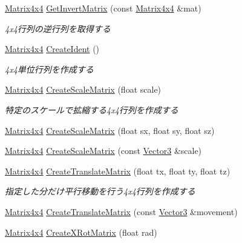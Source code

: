 \begin{DoxyCompactItemize}
\mbox{\hyperlink{struct_math_1_1_matrix4x4}{Matrix4x4}} \mbox{\hyperlink{namespace_math_a1511b5df243ca4ee521026cb9b373efd}{Get\+Invert\+Matrix}} (const \mbox{\hyperlink{struct_math_1_1_matrix4x4}{Matrix4x4}} \&mat)
\begin{DoxyCompactList}\small\item\em 4x4行列の逆行列を取得する \end{DoxyCompactList}\item 
\mbox{\hyperlink{struct_math_1_1_matrix4x4}{Matrix4x4}} \mbox{\hyperlink{namespace_math_aad7bb8945263031607f8b323d9ae1cd7}{Create\+Ident}} ()
\begin{DoxyCompactList}\small\item\em 4x4単位行列を作成する \end{DoxyCompactList}\item 
\mbox{\hyperlink{struct_math_1_1_matrix4x4}{Matrix4x4}} \mbox{\hyperlink{namespace_math_a70c81aec69f6a6b6e586a0d0f5d2ae71}{Create\+Scale\+Matrix}} (float scale)
\begin{DoxyCompactList}\small\item\em 特定のスケールで拡縮する4x4行列を作成する \end{DoxyCompactList}\item 
\mbox{\hyperlink{struct_math_1_1_matrix4x4}{Matrix4x4}} \mbox{\hyperlink{namespace_math_af37fd756ce6f0ed92743c168b170b695}{Create\+Scale\+Matrix}} (float sx, float sy, float sz)
\item 
\mbox{\hyperlink{struct_math_1_1_matrix4x4}{Matrix4x4}} \mbox{\hyperlink{namespace_math_abb993929e559b690bbb60e9504f3ad95}{Create\+Scale\+Matrix}} (const \mbox{\hyperlink{struct_math_1_1_vector3}{Vector3}} \&scale)
\item 
\mbox{\hyperlink{struct_math_1_1_matrix4x4}{Matrix4x4}} \mbox{\hyperlink{namespace_math_a22c654a35f22329b5f0ed96a82d843ca}{Create\+Translate\+Matrix}} (float tx, float ty, float tz)
\begin{DoxyCompactList}\small\item\em 指定した分だけ平行移動を行う4x4行列を作成する \end{DoxyCompactList}\item 
\mbox{\hyperlink{struct_math_1_1_matrix4x4}{Matrix4x4}} \mbox{\hyperlink{namespace_math_ad0007f1238972eb1db1fa2f1a2d3b834}{Create\+Translate\+Matrix}} (const \mbox{\hyperlink{struct_math_1_1_vector3}{Vector3}} \&movement)
\item 
\mbox{\hyperlink{struct_math_1_1_matrix4x4}{Matrix4x4}} \mbox{\hyperlink{namespace_math_ac4e4a920c3ea9b1afefe04ed2d4e3b34}{Create\+X\+Rot\+Matrix}} (float rad)

\end{DoxyCompactItemize}

